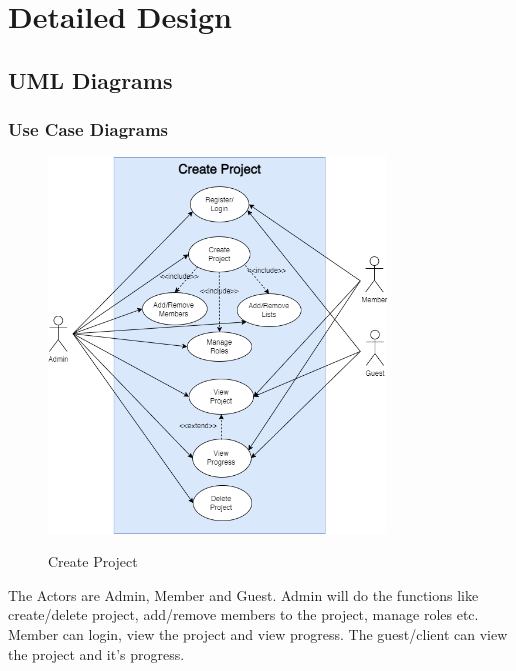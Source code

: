 \clearpage
\chapter{Detailed Design}
\section{UML Diagrams}

\subsection{Use Case Diagrams}
\begin{figure}[!htbp]
    \centering
    \includegraphics[width = 0.8\textwidth]{createproject.png}\\[0.1in]
    \caption{Create Project}
    \label{fig:my_label}
\end{figure}
The Actors are Admin, Member and Guest. Admin will do the functions like create/delete project, add/remove members to the project, manage roles etc. Member can login, view the project and view progress. The guest/client can view the project and it's progress.
\FloatBarrier


